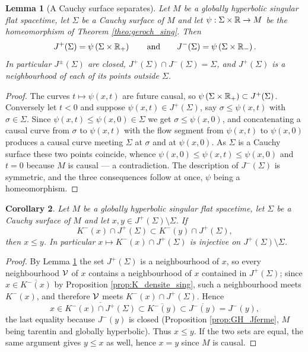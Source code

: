 \documentclass[a4paper,twoside]{article}
\newtheorem{lem}{Lemma}[section]
\newtheorem{cor}[lem]{Corollary}
\begin{document}
\begin{lem}[A Cauchy surface separates]\label{lem:Sigma_separe}
Let $M$ be a globally hyperbolic singular flat spacetime, let $\Sigma$ be a Cauchy surface of $M$ and
let $\psi:\Sigma\times \mathbb R\rightarrow M$ be the homeomorphism of Theorem \ref{theo:geroch_sing}.
Then
$$J^+(\Sigma)=\psi\left(\Sigma\times \mathbb R_+\right)\qquad\text{and}\qquad J^-(\Sigma)=\psi\left(\Sigma\times \mathbb R_-\right).$$
In particular $J^\pm(\Sigma)$ are closed, $J^+(\Sigma)\cap J^-(\Sigma)=\Sigma$, and $J^+(\Sigma)$ is
a neighbourhood of each of its points outside $\Sigma$.
\end{lem}
\begin{proof}
The curves $t\mapsto \psi(x,t)$ are future causal, so $\psi\left(\Sigma\times \mathbb R_+\right)\subset
J^+(\Sigma)$. Conversely let $t<0$ and suppose $\psi(x,t)\in J^+(\Sigma)$, say $\sigma\leq
\psi(x,t)$ with $\sigma\in \Sigma$. Since $\psi(x,t)\leq \psi(x,0)\in \Sigma$ we get $\sigma\leq
\psi(x,0)$, and concatenating a causal curve from $\sigma$ to $\psi(x,t)$ with the flow segment from
$\psi(x,t)$ to $\psi(x,0)$ produces a causal curve meeting $\Sigma$ at $\sigma$ and at $\psi(x,0)$.
As $\Sigma$ is a Cauchy surface these two points coincide, whence $\psi(x,0)\leq \psi(x,t)\leq
\psi(x,0)$ and $t=0$ because $M$ is causal --- a contradiction. The description of $J^-(\Sigma)$ is
symmetric, and the three consequences follow at once, $\psi$ being a homeomorphism.
\end{proof}

\begin{cor}\label{cor:K_ordre_Sigma}
Let $M$ be a globally hyperbolic singular flat spacetime, let $\Sigma$ be a Cauchy surface of $M$
and let $x,y\in J^+(\Sigma)\setminus \Sigma$. If
$$K^-(x)\cap J^+(\Sigma)\subset K^-(y)\cap J^+(\Sigma),$$
then $x\leq y$. In particular $x\mapsto K^-(x)\cap J^+(\Sigma)$ is injective on $J^+(\Sigma)\setminus \Sigma$.
\end{cor}
\begin{proof}
By Lemma \ref{lem:Sigma_separe} the set $J^+(\Sigma)$ is a neighbourhood of $x$, so every
neighbourhood $\mathcal V$ of $x$ contains a neighbourhood of $x$ contained in $J^+(\Sigma)$; since
$x\in \overline{K^-(x)}$ by Proposition \ref{prop:K_densite_sing}, such a neighbourhood meets
$K^-(x)$, and therefore $\mathcal V$ meets $K^-(x)\cap J^+(\Sigma)$. Hence
$$x\in \overline{K^-(x)\cap J^+(\Sigma)}\subset \overline{K^-(y)}\subset \overline{J^-(y)}=J^-(y),$$
the last equality because $J^-(y)$ is closed (Proposition \ref{prop:GH_Jferme}, $M$ being tarentin
and globally hyperbolic). Thus $x\leq y$. If the two sets are equal, the same argument gives $y\leq
x$ as well, hence $x=y$ since $M$ is causal.
\end{proof}
\end{document}
